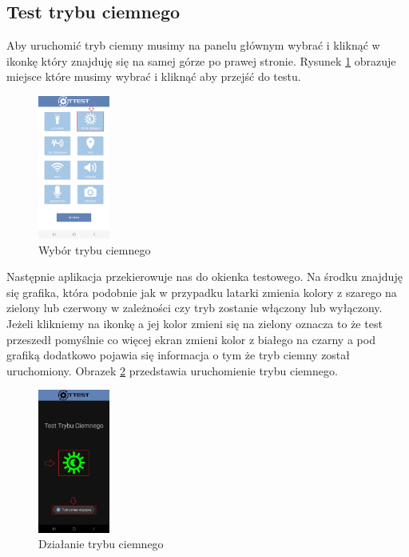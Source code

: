 \newpage


\subsection{Test trybu ciemnego}

Aby uruchomić tryb ciemny musimy na panelu głównym wybrać i kliknąć w ikonkę który znajduję się na samej górze po prawej stronie.
\newline
Rysunek \ref{rys:menu2} obrazuje miejsce które musimy wybrać i kliknąć aby przejść do testu.

\begin{figure}[!hbt]
	\begin{center}
		\includegraphics[angle=360, width=0.21\textwidth]{rys/punkt6/menu2.jpg}
		\caption{Wybór trybu ciemnego}
		\label{rys:menu2}
	\end{center}
\end{figure}

Następnie aplikacja przekierowuje nas do okienka testowego. Na środku znajduję się grafika, która podobnie jak w przypadku latarki zmienia kolory z szarego na zielony lub czerwony w zależności czy tryb zostanie włączony lub wyłączony. Jeżeli klikniemy na ikonkę a jej kolor zmieni się na zielony oznacza to że test przeszedł pomyślnie co więcej ekran zmieni kolor z białego na czarny a pod grafiką dodatkowo pojawia się informacja o tym że tryb ciemny został uruchomiony. 
\newline
Obrazek \ref{rys:tryb ciemny} przedstawia uruchomienie trybu ciemnego.

\begin{figure}[!hbt]
	\begin{center}
		\includegraphics[angle=360, width=0.21\textwidth]{rys/punkt6/tryb ciemny.jpg}
		\caption{Działanie trybu ciemnego}
		\label{rys:tryb ciemny}
	\end{center}
\end{figure}

